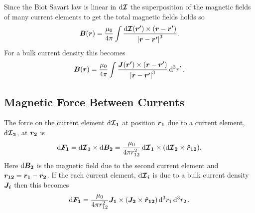     Since the Biot Savart law is linear in \(\dd{\bm{\mathcal{I}}}\) the superposition of the magnetic fields of many current elements to get the total magnetic fields holds so
    \[\bm{B}(\bm{r}) = \frac{\mu_0}{4\pi}\int \frac{\dd{\bm{\mathcal{I}}(\bm{r'})} \times (\bm{r} - \bm{r'})}{\abs{\bm{r} - \bm{r'}}^3}.\]
    For a bulk current density this becomes
    \[\bm{B}(\bm{r}) = \frac{\mu_0}{4\pi} \int \frac{\bm{J}(\bm{r'})\times(\bm{r} - \bm{r'})}{\abs{\bm{r} - \bm{r'}}^3} \dd[3]{r'}.\]
    
    \subsection{Magnetic Force Between Currents}
    The force on the current element \(\dd{\bm{\mathcal{I}_1}}\) at position \(\bm{r_1}\) due to a current element, \(\dd{\bm{\mathcal{I}_2}}\), at \(\bm{r_2}\) is
    \[\dd{\bm{F_1}} = \dd{\bm{\mathcal{I}_1}}\times\dd{\bm{B_2}} = \frac{\mu_0}{4\pi r_{12}^2} \dd{\bm{\mathcal{I}_1}} \times (\dd{\bm{\mathcal{I}_2}}\times \bm{\hat{r}}\bm{_{12}}).\]
    Here \(\dd{\bm{B_2}}\) is the magnetic field due to the second current element and \(\bm{r_{12}} = \bm{r_1} - \bm{r_2}\).
    If the each current element, \(\dd{\bm{\mathcal{I}_i}}\) is due to a bulk current density \(\bm{J_i}\) then this becomes
    \[\dd{\bm{F_1}} = \frac{\mu_0}{4\pi r_{12}^2} \bm{J_1}\times (\bm{J_2} \times \bm{\hat{r}}\bm{_{12}}) \dd[3]{r_1}\dd[3]{r_2}.\]
    
